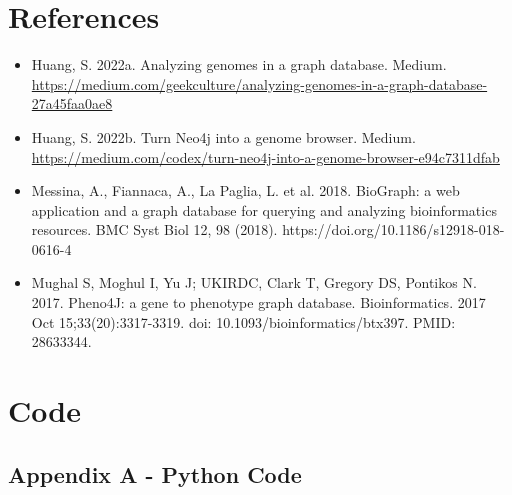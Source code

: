 \documentclass[]{article}
\begin{document}
\section{References}


\begin{itemize}
	
	\item Huang, S. 2022a. Analyzing genomes in a graph database. Medium. \url{https://medium.com/geekculture/analyzing-genomes-in-a-graph-database-27a45faa0ae8}
	
	\item Huang, S. 2022b. Turn Neo4j into a genome browser. Medium. \url{https://medium.com/codex/turn-neo4j-into-a-genome-browser-e94c7311dfab}
	
	\item Messina, A., Fiannaca, A., La Paglia, L. et al. 2018. BioGraph: a web application and a graph database for querying and analyzing bioinformatics resources. BMC Syst Biol 12, 98 (2018). https://doi.org/10.1186/s12918-018-0616-4
	
	\item Mughal S, Moghul I, Yu J; UKIRDC, Clark T, Gregory DS, Pontikos N. 2017. Pheno4J: a gene to phenotype graph database. Bioinformatics. 2017 Oct 15;33(20):3317-3319. doi: 10.1093/bioinformatics/btx397. PMID: 28633344.
	
\end{itemize}

\section{Code}

\subsection{Appendix A - Python Code}
\end{document}
